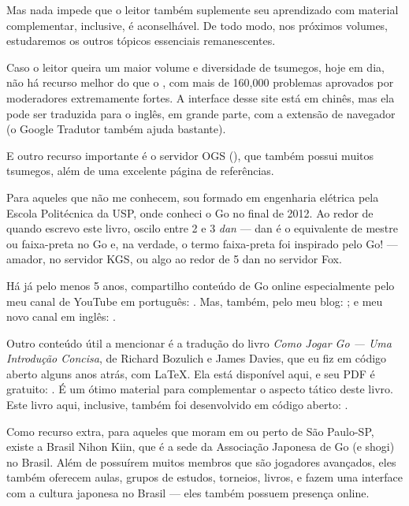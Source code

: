 Mas nada impede que o leitor também suplemente seu aprendizado com material complementar, inclusive, é aconselhável. De todo modo, nos próximos volumes, estudaremos os outros tópicos essenciais remanescentes.

Caso o leitor queira um maior volume e diversidade de tsumegos, hoje em dia, não há recurso melhor do que o , com mais de 160,000 problemas aprovados por moderadores extremamente fortes. A interface desse site está em chinês, mas ela pode ser traduzida para o inglês, em grande parte, com a extensão de navegador  (o Google Tradutor também ajuda bastante).

E outro recurso importante é o servidor OGS (), que também possui muitos tsumegos, além de uma excelente página de referências.

\bigskip
\smallskip
\smallskip

Para aqueles que não me conhecem, sou formado em engenharia elétrica pela Escola Politécnica da USP, onde conheci o Go no final de 2012. Ao redor de quando escrevo este livro, oscilo entre 2 e 3 \emph{dan} --- dan é o equivalente de mestre ou faixa-preta no Go e, na verdade, o termo faixa-preta foi inspirado pelo Go! --- amador, no servidor KGS, ou algo ao redor de 5 dan no servidor Fox.

Há já pelo menos 5 anos, compartilho conteúdo de Go online especialmente pelo meu canal de YouTube em português: . Mas, também, pelo meu blog: ; e meu novo canal em inglês: .

Outro conteúdo útil a mencionar é a tradução do livro \emph{Como Jogar Go --- Uma Introdução Concisa}, de Richard Bozulich e James Davies, que eu fiz em código aberto alguns anos atrás, com \LaTeX. Ela está disponível aqui, e seu PDF é gratuito: . É um ótimo material para complementar o aspecto tático deste livro. Este livro aqui, inclusive, também foi desenvolvido em código aberto: .

Como recurso extra, para aqueles que moram em ou perto de São Paulo-SP, existe a Brasil Nihon Kiin, que é a sede da Associação Japonesa de Go (e shogi) no Brasil. Além de possuírem muitos membros que são jogadores avançados, eles também oferecem aulas, grupos de estudos, torneios, livros, e fazem uma interface com a cultura japonesa no Brasil --- eles também possuem presença online.

